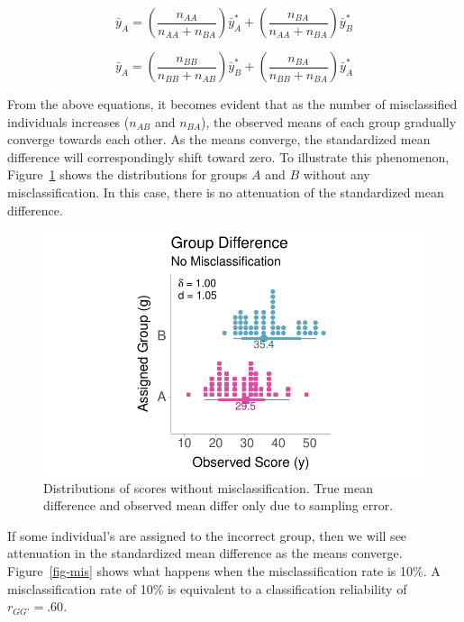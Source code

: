 \documentclass[
  letterpaper,
  DIV=11,
  numbers=noendperiod]{scrreprt}
\begin{document}
\[
\bar{y}_A = \left(\frac{n_{AA}}{n_{AA}+n_{BA}}\right)\bar{y}^*_A + \left(\frac{n_{BA}}{n_{AA}+n_{BA}}\right)\bar{y}^*_B
\]

\[
\bar{y}_A = \left(\frac{n_{BB}}{n_{BB}+n_{AB}}\right)\bar{y}^*_B + \left(\frac{n_{BA}}{n_{BB}+n_{BA}}\right)\bar{y}^*_A
\]

From the above equations, it becomes evident that as the number of
misclassified individuals increases (\(n_{AB}\) and \(n_{BA}\)), the
observed means of each group gradually converge towards each other. As
the means converge, the standardized mean difference will
correspondingly shift toward zero. To illustrate this phenomenon,
Figure~\ref{fig-nomis} shows the distributions for groups \(A\) and
\(B\) without any misclassification. In this case, there is no
attenuation of the standardized mean difference.

\begin{figure}

{\centering \includegraphics{misclassification_files/figure-pdf/fig-nomis-1.pdf}

}

\caption{\label{fig-nomis}Distributions of scores without
misclassification. True mean difference and observed mean differ only
due to sampling error.}

\end{figure}

If some individual's are assigned to the incorrect group, then we will
see attenuation in the standardized mean difference as the means
converge. Figure~\ref{fig-mis} shows what happens when the
misclassification rate is 10\%. A misclassification rate of 10\% is
equivalent to a classification reliability of \(r_{GG'}=.60\).
\end{document}

